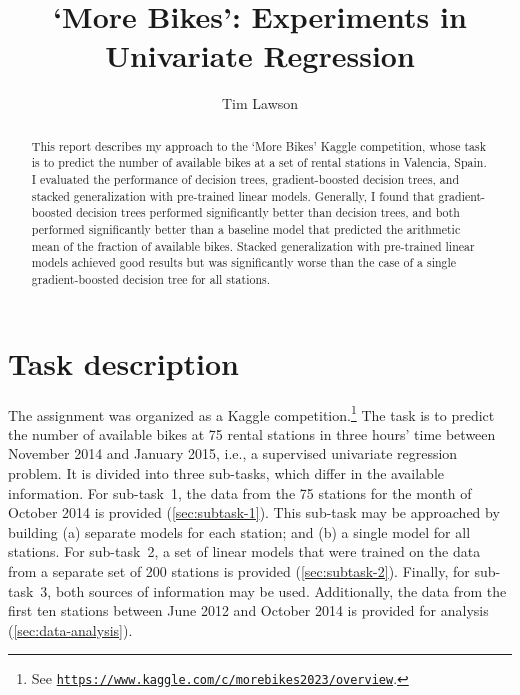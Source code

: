 \documentclass[11pt]{extarticle}
\newcommand{\kaggle}[1]{\href{https://www.kaggle.com/c/morebikes2023/#1}{\lstinline|https://www.kaggle.com/c/morebikes2023/#1|}}
\begin{document}
\title{`More Bikes': Experiments in Univariate Regression}
\author[]{Tim Lawson}
\date{}

\maketitle

\begin{abstract}
  This report describes my approach to the `More Bikes' Kaggle competition, whose task is
  to predict the number of available bikes at a set of rental stations in Valencia,
  Spain.
  I evaluated the performance of decision trees, gradient-boosted decision trees, and
  stacked generalization with pre-trained linear models.
  Generally, I found that gradient-boosted decision trees performed significantly better
  than decision trees, and both performed significantly better than a baseline model that
  predicted the arithmetic mean of the fraction of available bikes.
  Stacked generalization with pre-trained linear models achieved good results but was
  significantly worse than the case of a single gradient-boosted decision tree for all
  stations.
\end{abstract}

\section{Task description}
\label{sec:task-description}

The assignment was organized as a Kaggle competition.\footnote{See \kaggle{overview}.
}
The task is to predict the number of available bikes at 75 rental stations in three
hours' time between November 2014 and January 2015, i.e., a supervised univariate
regression problem.
It is divided into three sub-tasks, which differ in the available information.
For sub-task~1, the data from the 75 stations for the month of October 2014 is provided
(\cref{sec:subtask-1}).
This sub-task may be approached by building (a) separate models for each station; and
(b) a single model for all stations.
For sub-task~2, a set of linear models that were trained on the data from a separate
set of 200 stations is provided (\cref{sec:subtask-2}).
Finally, for sub-task~3, both sources of information may be used.
Additionally, the data from the first ten stations between June 2012 and October 2014
is provided for analysis (\cref{sec:data-analysis}).
\end{document}

